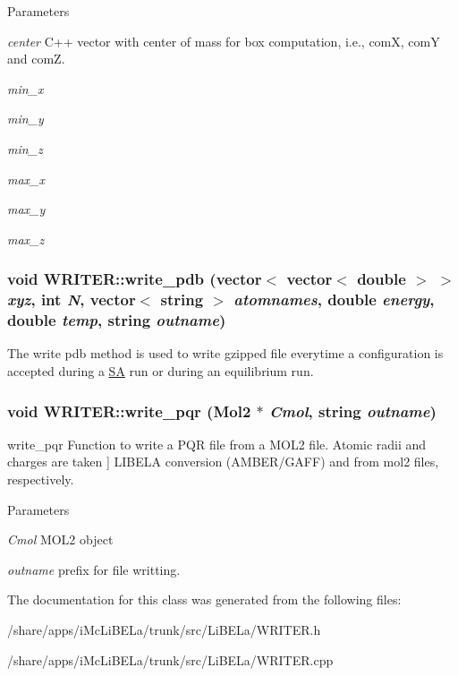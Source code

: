 \begin{DoxyParams}{Parameters}
\item[{\em center}]C++ vector with center of mass for box computation, i.e., comX, comY and comZ. \item[{\em min\_\-x}]\item[{\em min\_\-y}]\item[{\em min\_\-z}]\item[{\em max\_\-x}]\item[{\em max\_\-y}]\item[{\em max\_\-z}]\end{DoxyParams}
\hypertarget{classWRITER_a953d816265ab366b0e700cfb1083a9c1}{
\subsubsection[{write\_\-pdb}]{\setlength{\rightskip}{0pt plus 5cm}void WRITER::write\_\-pdb (vector$<$ vector$<$ double $>$ $>$ {\em xyz}, \/  int {\em N}, \/  vector$<$ string $>$ {\em atomnames}, \/  double {\em energy}, \/  double {\em temp}, \/  string {\em outname})}}
\label{classWRITER_a953d816265ab366b0e700cfb1083a9c1}
The write pdb method is used to write gzipped file everytime a configuration is accepted during a \hyperlink{classSA}{SA} run or during an equilibrium run. \hypertarget{classWRITER_ae7b3e548525f5fe8dd27b228f5c0eb63}{
\subsubsection[{write\_\-pqr}]{\setlength{\rightskip}{0pt plus 5cm}void WRITER::write\_\-pqr ({\bf Mol2} $\ast$ {\em Cmol}, \/  string {\em outname})}}
\label{classWRITER_ae7b3e548525f5fe8dd27b228f5c0eb63}


write\_\-pqr Function to write a PQR file from a MOL2 file. Atomic radii and charges are taken \mbox{]} LIBELA conversion (AMBER/GAFF) and from mol2 files, respectively. 
\begin{DoxyParams}{Parameters}
\item[{\em Cmol}]MOL2 object \item[{\em outname}]prefix for file writting. \end{DoxyParams}


The documentation for this class was generated from the following files:\begin{DoxyCompactItemize}
\item 
/share/apps/iMcLiBELa/trunk/src/LiBELa/WRITER.h\item 
/share/apps/iMcLiBELa/trunk/src/LiBELa/WRITER.cpp\end{DoxyCompactItemize}
